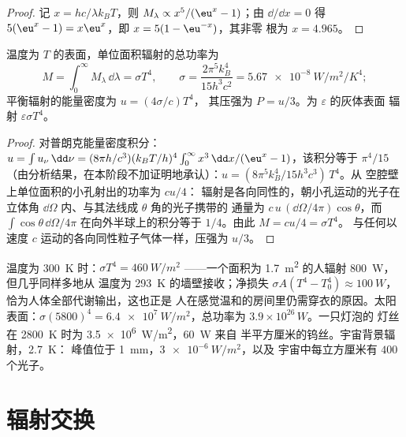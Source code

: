 \begin{proof}
记 $x = hc/\lambda k_BT$，则 $M_\lambda \propto x^5/(\eu^x - 1)$；由 $\dd/\dd x = 0$
得 $5(\eu^x - 1) = x\eu^x$，即 $x = 5(1 - \eu^{-x})$，其非零
根为 $x = 4.965$。
\end{proof}

\begin{theorem}\label{thm:b2:thermal-radiation:stefan}
温度为 $T$ 的表面，单位面积辐射的总功率为
\[
M = \int_0^\infty M_\lambda\,\dd\lambda = \sigma T^4, \qquad
\sigma = \frac{2\pi^5k_B^4}{15h^3c^2} = \qty{5.67e-8}{W/m^2/K^4} ;
\]
平衡辐射的能量密度为 $u = (4\sigma/c)T^4$，
其压强为 $P = u/3$。为 $\varepsilon$ 的灰体表面
辐射 $\varepsilon\sigma T^4$。
\end{theorem}

\begin{proof}
对普朗克能量密度积分：$u = \int u_\nu\,\dd\nu = (8\pi h/c^3)(k_BT/h)^4
\int_0^\infty x^3\,\dd x/(\eu^x - 1)$，该积分等于 $\pi^4/15$
（由分析结果，在本阶段不加证明地承认）：$u = (8\pi^5k_B^4/15h^3c^3)\,T^4$。从
空腔壁上单位面积的小孔射出的功率为 $cu/4$：
辐射是各向同性的，朝小孔运动的光子在
立体角 $\dd\Omega$ 内、与其法线成 $\theta$ 角的光子携带的
通量为 $c\,u\,(\dd\Omega/4\pi)\cos\theta$，而 $\int\cos\theta\,\dd\Omega/4\pi$
在向外半球上的积分等于 $1/4$。由此 $M = cu/4 = \sigma T^4$。
与任何以速度 $c$ 运动的各向同性粒子气体一样，压强为
$u/3$。
\end{proof}

\begin{example}[数量级]\label{ex:b2:thermal-radiation:orders}
温度为 \qty{300}{K} 时：$\sigma T^4 = \qty{460}{W/m^2}$ ——一个面积为
\qty{1.7}{m^2} 的人辐射 \qty{800}{W}，但几乎同样多地从
温度为 \qty{293}{K} 的墙壁接收；净损失 $\sigma A(T^4 - T_0^4) \approx
\qty{100}{W}$，恰为人体全部代谢输出，这也正是
人在感觉温和的房间里仍需穿衣的原因。太阳表面：$\sigma
(5800)^4 = \qty{6.4e7}{W/m^2}$，总功率为 $3.9 \times 10^{26}\,\unit{W}$。一只灯泡的
灯丝在 \qty{2800}{K} 时为 \qty{3.5e6}{W/m^2}，\qty{60}{W} 来自
半平方厘米的钨丝。宇宙背景辐射，\qty{2.7}{K}：
峰值位于 \qty{1}{mm}，$\qty{3e-6}{W/m^2}$，以及
宇宙中每立方厘米有 $400$ 个光子。
\end{example}

\section{辐射交换}

